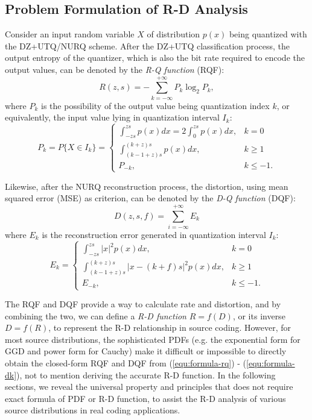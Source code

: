 \documentclass[smallabstract,smallcaptions]{dccpaper}
\begin{document}
\subsection{Problem Formulation of R-D Analysis}

Consider an input random variable $X$ of distribution $p(x)$ being quantized with the DZ+UTQ/NURQ scheme. After the DZ+UTQ classification process, the output entropy of the quantizer, which is also the bit rate required to encode the output values, can be denoted by the \emph{R-Q function} (RQF):
\begin{equation}\label{equ:formula-rq}
	R(z, s) = -\sum_{k=-\infty}^{+\infty} P_k \log_2 P_k ,
\end{equation}
where $P_k$ is the possibility of the output value being quantization index $k$, or equivalently, the input value lying in quantization interval $I_{k}$:
\begin{equation}\label{equ:formula-pk}
	P_k = P\{X \in I_k\} =
	\begin{cases}
		\int_{-z s}^{z s} p(x) dx
		= 2 \int_{0}^{z s} p(x) dx,
		& k=0 \\
		\int_{(k-1+z) s}^{(k+z) s} p(x) dx,
		& k \ge 1 \\
		P_{-k},
		& k \le -1 .
	\end{cases}
\end{equation}  

Likewise, after the NURQ reconstruction process, the distortion, using mean squared error (MSE) as criterion, can be denoted by the \emph{D-Q function} (DQF):
\begin{equation}\label{equ:formula-dq}
	D(z, s, f) =\sum_{i=-\infty}^{+\infty} E_k
\end{equation}
where $E_k$ is the reconstruction error generated in quantization interval $I_k$:
\begin{equation}\label{equ:formula-dk}
	E_k=
	\begin{cases}
		\int_{-z s}^{z s} |x|^2 p(x) dx,
		& k=0 \\
		\int_{(k-1+z) s}^{(k+z) s} |x - (k+f) s|^2 p(x) dx,
		& k \ge 1 \\
		E_{-k},
		& k \le -1 .
	\end{cases}
\end{equation}

The RQF and DQF provide a way to calculate rate and distortion, and by combining the two, we can define a \emph{R-D function} $R=f(D)$, or its inverse $D=f(R)$, to represent the R-D relationship in source coding. However, for most source distributions, the sophisticated PDFs (e.g. the exponential form for GGD and power form for Cauchy) make it difficult or impossible to directly obtain the closed-form RQF and DQF from (\ref{equ:formula-rq}) - (\ref{equ:formula-dk}), not to mention deriving the accurate R-D function. In the following sections, we reveal the universal property and principles that does not require exact formula of PDF or R-D function, to assist the R-D analysis of various source distributions in real coding applications.
\end{document}
